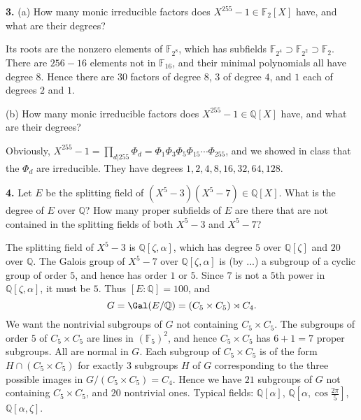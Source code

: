 \documentclass[a4paper,11pt,final,openany]{memoir}
\theoremstyle{nonumberplain}
\begin{document}
\medskip\noindent\textbf{3.} (a) How many monic irreducible factors does
$X^{255}-1\in\mathbb{F}_{2}[X]$ have, and what are their degrees?

Its roots are the nonzero elements of $\mathbb{F}_{2^{8}}$, which has
subfields $\mathbb{F}_{2^{4}}\mathbb{\supset F}_{2^{2}}\mathbb{\supset F}_{2}
$. There are $256-16$ elements not in $\mathbb{F}_{16}$, and their minimal
polynomials all have degree $8$. Hence there are $30$ factors of degree $8$,
$3$ of degree $4$, and $1$ each of degrees $2$ and $1$.

\noindent(b) How many monic irreducible factors does $X^{255}-1\in{\mathbb{Q}%
}[X]$ have, and what are their degrees?

Obviously, $X^{255}-1=\prod_{d|255}\Phi_{d}=\Phi_{1}\Phi_{3}\Phi_{5}\Phi
_{15}\cdots\Phi_{255}$, and we showed in class that the $\Phi_{d}$ are
irreducible. They have degrees $1,2,4,8,16,32,64,128$.

\medskip\noindent\textbf{4.} Let $E$ be the splitting field of $(X^{5}%
-3)(X^{5}- 7)\in{\mathbb{Q}}[X]$. What is the degree of $E$ over ${\mathbb{Q}%
}$? How many proper subfields of $E$ are there that are not contained in the
splitting fields of both $X^{5}-3$ and $X^{5}-7$?

The splitting field of $X^{5}-3$ is ${\mathbb{Q}}[\zeta,\alpha]$, which has
degree $5$ over ${\mathbb{Q}}[\zeta]$ and $20$ over ${\mathbb{Q}}$. The Galois
group of $X^{5}-7$ over ${\mathbb{Q}}[\zeta,\alpha]$ is (by ...) a subgroup of
a cyclic group of order $5$, and hence has order $1$ or $5$. Since $7$ is not
a $5$th power in ${\mathbb{Q}}[\zeta,\alpha]$, it must be $5$. Thus
$[E\colon{\mathbb{Q}}]=100$, and
\[
G=\Gal(E/{\mathbb{Q}})=(C_{5}\times C_{5})\rtimes C_{4}.
\]
We want the nontrivial subgroups of $G$ not containing $C_{5}\times C_{5}$.
The subgroups of order $5$ of $C_{5}\times C_{5}$ are lines in $(\mathbb{F}%
_{5})^{2}$, and hence $C_{5}\times C_{5}$ has $6+1=7$ proper subgroups. All
are normal in $G$. Each subgroup of $C_{5}\times C_{5}$ is of the form
$H\cap(C_{5}\times C_{5})$ for exactly $3$ subgroups $H$ of $G$ corresponding
to the three possible images in $G/(C_{5}\times C_{5})=C_{4}$. Hence we have
$21$ subgroups of $G$ not containing $C_{5}\times C_{5}$, and $20$ nontrivial
ones. Typical fields: ${\mathbb{Q}}[\alpha]$, ${\mathbb{Q}}[\alpha,\cos
\frac{2\pi}{5}]$, ${\mathbb{Q}}[\alpha,\zeta]$.

\end{document}
